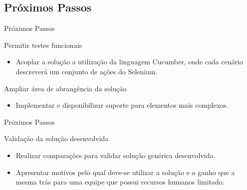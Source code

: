 \documentclass{beamer}
\begin{document}
\subsection{Próximos Passos}
\begin{frame}{Próximos Passos}
    \item Permitir testes funcionais
	\begin{itemize}
		\item Acoplar a solução a utilização da linguagem Cucumber, onde cada cenário descreverá um conjunto de ações do Selenium.
	\end{itemize}
    \item Ampliar área de abrangência da solução
	\begin{itemize}
		\item Implementar e disponibilizar suporte para elementos mais complexos.
	\end{itemize}
\end{frame}
\begin{frame}{Próximos Passos}
    \item Validação da solução desenvolvida
	\begin{itemize}
		\item Realizar comparações para validar solução genérica desenvolvida.
		\item Apresentar motivos pelo qual deve-se utilizar a solução e o ganho que a mesma trás para uma equipe que possui recursos humanos limitado.
	\end{itemize}
\end{frame}


\begin{frame}
\titlepage
\end{frame}
\end{document}
